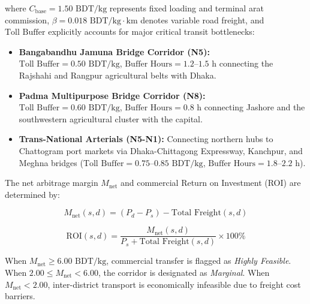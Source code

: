 where $C_{\text{base}} = 1.50\text{ BDT/kg}$ represents fixed loading and terminal arat commission, $\beta = 0.018\text{ BDT/kg}\cdot\text{km}$ denotes variable road freight, and $\text{Toll Buffer}$ explicitly accounts for major critical transit bottlenecks:
\begin{itemize}
    \item \textbf{Bangabandhu Jamuna Bridge Corridor (N5):} $\text{Toll Buffer} = 0.50\text{ BDT/kg}$, $\text{Buffer Hours} = 1.2\text{--}1.5\text{ h}$ connecting the Rajshahi and Rangpur agricultural belts with Dhaka.
    \item \textbf{Padma Multipurpose Bridge Corridor (N8):} $\text{Toll Buffer} = 0.60\text{ BDT/kg}$, $\text{Buffer Hours} = 0.8\text{ h}$ connecting Jashore and the southwestern agricultural cluster with the capital.
    \item \textbf{Trans-National Arterials (N5-N1):} Connecting northern hubs to Chattogram port markets via Dhaka-Chittagong Expressway, Kanchpur, and Meghna bridges ($\text{Toll Buffer} = 0.75\text{--}0.85\text{ BDT/kg}$, $\text{Buffer Hours} = 1.8\text{--}2.2\text{ h}$).
\end{itemize}

The net arbitrage margin $M_{\text{net}}$ and commercial Return on Investment (ROI) are determined by:

\begin{equation}
M_{\text{net}}(s, d) = \left( P_d - P_s \right) - \text{Total Freight}(s, d)
\end{equation}

\begin{equation}
\text{ROI}(s, d) = \frac{M_{\text{net}}(s, d)}{P_s + \text{Total Freight}(s, d)} \times 100\%
\end{equation}

When $M_{\text{net}} \ge 6.00\text{ BDT/kg}$, commercial transfer is flagged as \textit{Highly Feasible}. When $2.00 \le M_{\text{net}} < 6.00$, the corridor is designated as \textit{Marginal}. When $M_{\text{net}} < 2.00$, inter-district transport is economically infeasible due to freight cost barriers.

